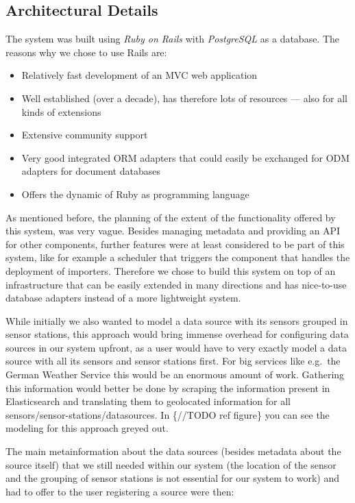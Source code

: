 \subsection{Architectural Details}\label{architectural-details}

The system was built using \emph{Ruby on Rails} with \emph{PostgreSQL}
as a database. The reasons why we chose to use Rails are:

\begin{itemize}
\tightlist
\item
  Relatively fast development of an MVC web application
\item
  Well established (over a decade), has therefore lots of resources ---
  also for all kinds of extensions
\item
  Extensive community support
\item
  Very good integrated ORM adapters that could easily be exchanged for
  ODM adapters for document databases
\item
  Offers the dynamic of Ruby as programming language
\end{itemize}

As mentioned before, the planning of the extent of the functionality
offered by this system, was very vague. Besides managing metadata and
providing an API for other components, further features were at least
considered to be part of this system, like for example a scheduler that
triggers the component that handles the deployment of importers.
Therefore we chose to build this system on top of an infrastructure that
can be easily extended in many directions and has nice-to-use database
adapters instead of a more lightweight system.

While initially we also wanted to model a data source with its sensors
grouped in sensor stations, this approach would bring immense overhead
for configuring data sources in our system upfront, as a user would have
to very exactly model a data source with all its sensors and sensor
stations first. For big services like e.g.~the German Weather Service
this would be an enormous amount of work. Gathering this information
would better be done by scraping the information present in
Elasticsearch and translating them to geolocated information for all
sensors/sensor-stations/datasources. In \{//TODO ref figure\} you can
see the modeling for this approach greyed out.

The main metainformation about the data sources (besides metadata about
the source itself) that we still needed within our system (the location
of the sensor and the grouping of sensor stations is not essential for
our system to work) and had to offer to the user registering a source
were then:


